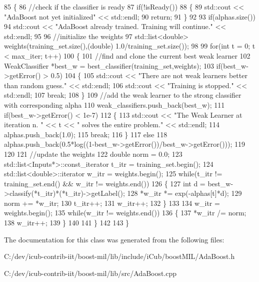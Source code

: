 \begin{DoxyCode}
85 \{
86     \textcolor{comment}{//check if the classifier is ready}
87     \textcolor{keywordflow}{if}(!isReady())
88     \{
89         std::cout << \textcolor{stringliteral}{"AdaBoost not yet initialized"} << std::endl;
90         \textcolor{keywordflow}{return};
91     \}
92 
93     \textcolor{keywordflow}{if}(alphas.size())
94         std::cout << \textcolor{stringliteral}{"AdaBoost already trained. Training will continue."} << std::endl;
95 
96     \textcolor{comment}{//initialize the weights}
97     std::list<double> weights(training\_set.size(),(double) 1.0/training\_set.size());
98 
99     \textcolor{keywordflow}{for}(\textcolor{keywordtype}{int} t = 0; t < max\_iter; t++)
100     \{
101         \textcolor{comment}{//find and clone the current best weak learner}
102         WeakClassifier *best\_w = best\_classifier(training\_set,weights);
103         \textcolor{keywordflow}{if}(best\_w->getError() > 0.5)
104         \{
105             std::cout << \textcolor{stringliteral}{"There are not weak learners better than random guess."} << std::endl;
106             std::cout << \textcolor{stringliteral}{"Training is stopped."} << std::endl;
107             \textcolor{keywordflow}{break};
108         \}
109         \textcolor{comment}{//add the weak learner to the strong classifier with corresponding alpha}
110         weak_classifiers.push\_back(best\_w);
111         \textcolor{keywordflow}{if}(best\_w->getError() < 1e-7)
112         \{
113             std::cout << \textcolor{stringliteral}{"The Weak Learner at iteration n. "} << t << \textcolor{stringliteral}{" solves the entire problem."} << 
      std::endl;
114             alphas.push\_back(1.0);
115             \textcolor{keywordflow}{break};
116         \}
117         \textcolor{keywordflow}{else}
118             alphas.push\_back(0.5*log((1-best\_w->getError())/best\_w->getError()));
119 
120 
121         \textcolor{comment}{//update the weights}
122         \textcolor{keywordtype}{double} norm = 0.0;
123         std::list<Inputs*>::const\_iterator t\_itr = training\_set.begin();
124         std::list<double>::iterator w\_itr = weights.begin();
125         \textcolor{keywordflow}{while}(t\_itr != training\_set.end() && w\_itr != weights.end())
126         \{
127             \textcolor{keywordtype}{int} d = best\_w->classify(*t\_itr)*(*t\_itr)->getLabel();
128             *w\_itr *= exp(-alphas[t]*d);
129             norm += *w\_itr;
130             t\_itr++;
131             w\_itr++;
132         \}
133 
134         w\_itr = weights.begin();
135         \textcolor{keywordflow}{while}(w\_itr != weights.end())
136         \{
137             *w\_itr /= norm;
138             w\_itr++;
139         \}
140 
141     \}
142 
143 \}
\end{DoxyCode}


The documentation for this class was generated from the following files\+:\begin{DoxyCompactItemize}
\item 
C\+:/dev/icub-\/contrib-\/iit/boost-\/mil/lib/include/i\+Cub/boost\+M\+I\+L/Ada\+Boost.\+h\item 
C\+:/dev/icub-\/contrib-\/iit/boost-\/mil/lib/src/Ada\+Boost.\+cpp\end{DoxyCompactItemize}
